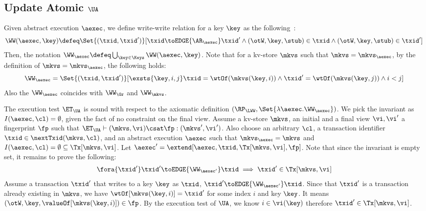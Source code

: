 \subsection{Update Atomic \( \UA \)}
\label{sec:sound-complete-ua}

Given abstract execution \( \aexec \), we define write-write relation for a key \( \key \) as the following~\cite{framework-concur}:
\[ 
    \WW(\aexec,\key) \defeq \Set{(\txid, \txid')}[\txid \toEDGE{\AR_\aexec} \txid' \land (\otW,\key, \stub ) \in \txid \land (\otW,\key, \stub ) \in \txid' ]
\]
Then, the notation \( \WW_\aexec \defeq \bigcup_{\key \in \Keys} \WW(\aexec, \key) \).
Note that for a kv-store \( \mkvs \) such that \( \mkvs = \mkvs_\aexec \),
by the definition of  \(  \mkvs = \mkvs_\aexec \), 
the following holds:
\[
    \WW_\aexec = \Set{(\txid, \txid')}[\exsts{\key, i,j } \txid = \wtOf(\mkvs(\key, i)) \land \txid' = \wtOf(\mkvs(\key, j)) \land i < j]
\]
Also the \( \WW_\aexec \) coincides with \( \WW_\Gr \) and \( \WW_\mkvs \).

The execution test $\ET_\UA$ is sound with respect to the axiomatic definition \( (\RP_{\LWW}, \Set{\lambda \aexec. \WW_\aexec }) \).
We pick the invariant as \( I( \aexec, \cl ) = \emptyset \), given the fact of no constraint on the final view.
Assume a kv-store $\mkvs$, an initial and a final view $\vi, \vi'$  a fingerprint $\fp$ 
such that $\ET_{\UA} \vdash (\mkvs, \vi) \csat \fp: (\mkvs', \vi')$. 
Also choose an arbitrary $\cl$, a transaction identifier $\txid \in \nextTxid(\mkvs, \cl)$, 
and an abstract execution $\aexec$ such that $\mkvs_{\aexec} = \mkvs$ and 
\( I(\aexec, \cl) =  \emptyset \subseteq \Tx[\mkvs, \vi] \).
Let \( \aexec' = \extend[\aexec, \txid, \Tx[\mkvs, \vi], \fp] \).
Note that since the invariant is empty set, it remains to prove the following:
\[
    \begin{array}{@{}l@{}}
        \fora{ \txid' } \txid' \toEDGE{\WW_{\aexec'}} \txid \implies \txid' \in \Tx[\mkvs, \vi]
    \end{array}
\]
Assume a transaction \( \txid' \) that writes to a key \( \key \) as \( \txid \), \ie \( \txid' \toEDGE{\WW_{\aexec'}} \txid \).
Since that \( \txid' \) is a transaction already existing in \( \mkvs\),
we have \( \wtOf[\mkvs(\key, i)] = \txid' \) for some index \( i \) and key \( \key \).
It means \( (\otW, \key, \valueOf[\mkvs(\key, i)]) \in \fp \).
By the execution test of \( \UA \), we know \( i \in \vi(\key) \) therefore \( \txid' \in \Tx[\mkvs, \vi] \).

